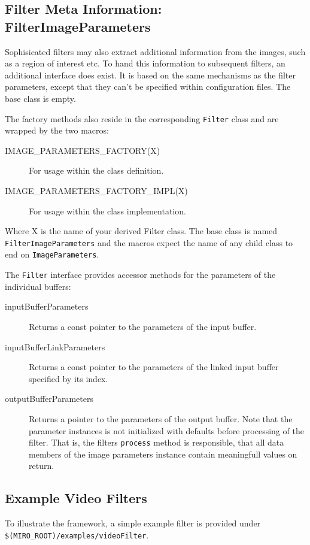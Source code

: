 \subsection{Filter Meta Information: FilterImageParameters}

Sophisicated filters may also extract additional information from the
images, such as a region of interest etc. To hand this information to
subsequent filters, an additional interface does exist. It is based on
the same mechanisms as the filter parameters, except that they can't
be specified within configuration files. The base class is empty.

The factory methods also reside in the corresponding {\tt Filter}
class and are wrapped by the two macros:
\begin{description}
\item[IMAGE\_PARAMETERS\_FACTORY(X)] For usage within the class definition.
\item[IMAGE\_PARAMETERS\_FACTORY\_IMPL(X)] For usage within the class implementation.
\end{description}
Where X is the name of your derived Filter class. The base class is
named {\tt FilterImageParameters} and the macros expect the name of
any child class to end on {\tt ImageParameters}.

The {\tt Filter} interface provides accessor methods for the
parameters of the individual buffers:
\begin{description}
\item[inputBufferParameters] Returns a const pointer to the parameters
  of the input buffer.
\item[inputBufferLinkParameters] Returns a const pointer to the
  parameters of the linked input buffer specified by its index.
\item[outputBufferParameters] Returns a pointer to the parameters of
  the output buffer. Note that the parameter instances is not
  initialized with defaults before processing of the filter. That is,
  the filters {\tt process} method is responsible, that all data
  members of the image parameters instance contain meaningfull values
  on return.
\end{description}


\subsection{Example Video Filters}

To illustrate the framework, a simple example filter is provided under
{\tt \$(MIRO\_ROOT)/examples/videoFilter}.

